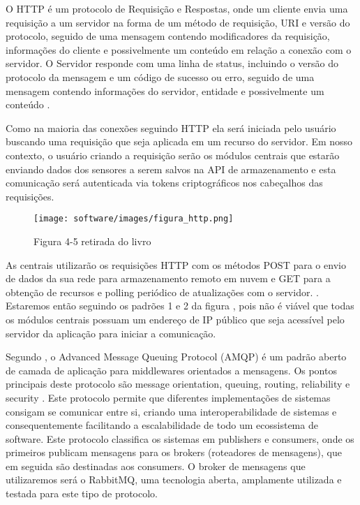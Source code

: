     O HTTP é um protocolo de Requisição e Respostas, onde um cliente envia uma requisição a um servidor na forma de um método de requisição, URI e versão do protocolo, seguido de uma mensagem contendo modificadores da requisição, informações do cliente e possivelmente um conteúdo em relação a conexão com o servidor. O Servidor responde com uma linha de status, incluindo o versão do protocolo da mensagem e um código de sucesso ou erro, seguido de uma mensagem contendo informações do servidor, entidade e possivelmente um conteúdo \cite{rfc}.

    Como na maioria das conexões seguindo HTTP ela será iniciada pelo usuário buscando uma requisição que seja aplicada em um recurso do servidor. Em nosso contexto, o usuário criando a requisição serão os módulos centrais que estarão enviando dados dos sensores a serem salvos na API de armazenamento e esta comunicação será autenticada via tokens criptográficos nos cabeçalhos das requisições.

    \begin{figure}
        \texttt{[image: software/images/figura\_http.png]}
        \caption{Figura 4-5 retirada do livro \cite{pfister_2011}}
        \label{fig:http}
    \end{figure}

    As centrais utilizarão os requisições HTTP com os métodos POST para o envio de dados da sua rede para armazenamento remoto em nuvem e GET para a obtenção de recursos e polling periódico de atualizações com o servidor. \cite{pfister_2011}. Estaremos então seguindo os padrões 1 e 2 da figura \cite{fig:http}, pois não é viável que todas os módulos centrais possuam um endereço de IP público que seja acessível pelo servidor da aplicação para iniciar a comunicação.
    
    Segundo \cite{ohara_2007}, o Advanced Message Queuing Protocol (AMQP) é um padrão aberto de camada de aplicação para middlewares orientados a mensagens. Os pontos principais deste protocolo são message orientation, queuing, routing, reliability e security .
    Este protocolo permite que diferentes implementações de sistemas consigam se comunicar entre si, criando uma interoperabilidade de sistemas e consequentemente facilitando a escalabilidade de todo um ecossistema de software.
    Este protocolo classifica os sistemas em publishers e consumers, onde os primeiros publicam mensagens para os brokers (roteadores de mensagens), que em seguida são destinadas aos consumers.
    O broker de mensagens que utilizaremos será o RabbitMQ, uma tecnologia aberta, amplamente utilizada e testada para este tipo de protocolo.
    

